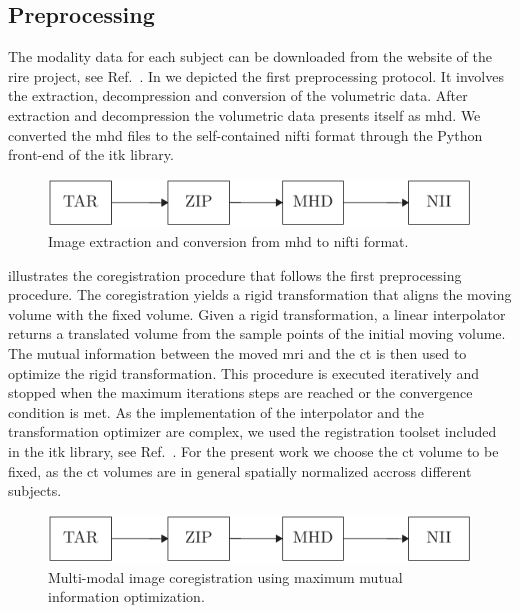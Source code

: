 \subsection{Preprocessing}

The modality data for each subject can be downloaded from the website of the
\gls{rire} project, see Ref.~\cite{RIRE}. In  we depicted
the first preprocessing protocol. It involves the extraction, decompression and
conversion of the volumetric data. After extraction and decompression the
volumetric data presents itself as \gls{mhd}. We converted the \gls{mhd} files
to the self-contained \gls{nifti} format through the Python front-end of the
\gls{itk} library.
\begin{figure}[h]
  \centering
  \includegraphics[page=1,width=.8\linewidth]{figure/diagrams.pdf}
  \caption{Image extraction and conversion from \gls{mhd} to \gls{nifti}
		format.
	}\label{fig:conversion}
\end{figure}
 illustrates the coregistration procedure that follows
the first preprocessing procedure. The coregistration yields a rigid
transformation that aligns the moving volume with the fixed volume. Given a
rigid transformation, a linear interpolator returns a translated volume from
the sample points of the initial moving volume. The mutual information between
the moved \gls{mri} and the \gls{ct} is then used to optimize the
rigid transformation. This procedure is executed iteratively and stopped when
the maximum iterations steps are reached or the convergence condition is met.
As the implementation of the interpolator and the transformation optimizer
are complex, we used the registration toolset included in the \gls{itk}
library, see Ref.~\cite{Yaniv2018}.
For the present work we choose the \gls{ct} volume to be fixed, as the
\gls{ct} volumes are in general spatially normalized accross different
subjects.
\begin{figure}[h]
  \centering
  \includegraphics[page=2,width=.8\linewidth]{figure/diagrams.pdf}
  \caption{Multi-modal image coregistration using maximum mutual information
    optimization.
	}\label{fig:registration}
\end{figure}
